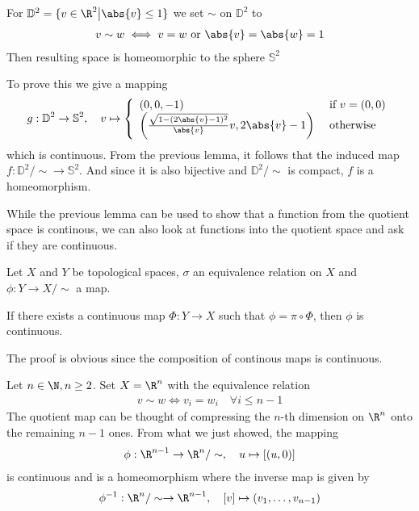 
\begin{ex}[]
For $\mathbb{D}^{2} = \{v \in \R^{2} \big\vert \abs{v} \leq 1\}$ we set $\sim$ on $\mathbb{D}^{2}$ to
\begin{align*}
  v \sim w \iff v = w \text{ or } \abs{v} = \abs{w} = 1
\end{align*}
Then resulting space is homeomorphic to the sphere $\mathbb{S}^{2}$

To prove this we give a mapping
\begin{align*}
  g: \mathbb{D}^{2}\to \mathbb{S}^{2}, \quad v \mapsto \left\{\begin{array}{ll}
      (0,0,-1) & \text{ if } v = (0,0)\\
      \left(
      \frac{\sqrt{1 - (2 \abs{v} - 1)^{2}}}{\abs{v}}v,
      2 \abs{v} - 1
      \right)& 
      \text{ otherwise}
  \end{array} \right.
\end{align*}
which is continuous. 
From the previous lemma, it follows that the induced map $f: \mathds{D}^{2}/\sim \to  \mathds{S}^{2}$.
And since it is also bijective and $\mathds{D}^{2}/\sim$ is compact, $f$ is a homeomorphism.
\end{ex}


While the previous lemma can be used to show that a function from the quotient space is continous, we can also look at functions into the quotient space and ask if they are continuous.
\begin{lem}[]
  Let $X$ and $Y$ be topological spaces, $\sigma$ an equivalence relation on $X$ and $\phi: Y \to X/\sim$ a map.

  If there exists a continuous map $\Phi: Y \to X$ such that $\phi = \pi \circ \Phi$, then $\phi$ is continuous.

\begin{center}
\end{center}
\end{lem}
The proof is obvious since the composition of continous maps is continuous.

\begin{ex}[]
Let $n \in \N, n \geq 2$. Set $X = \R^{n}$ with the equivalence relation
\begin{align*}
  v \sim w \iff v_i = w_i \quad \forall i \leq n -1
\end{align*}
The quotient map can be thought of compressing the $n$-th dimension on $\R^{n}$ onto the remaining $n-1$ ones. 
From what we just showed, the mapping
\begin{align*}
  \phi: \R^{n-1} \to \R^{n}/\sim, \quad u \mapsto [(u,0)]
\end{align*}
is continuous and is a homeomorphism where the inverse map is given by
\begin{align*}
  \phi^{-1}: \R^{n}/\sim \to \R^{n-1}, \quad [v] \mapsto  (v_1,\ldots,v_{n-1})
\end{align*}
\end{ex}


